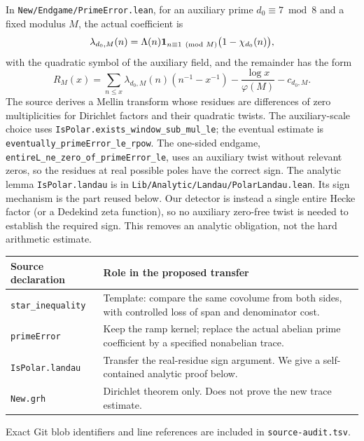 \documentclass[11pt,letterpaper]{article}
\theoremstyle{remark}\newtheorem{remark}[theorem]{Remark}
\newcommand{\code}[1]{\nolinkurl{#1}}
\begin{document}
In \code{New/Endgame/PrimeError.lean}, for an auxiliary prime $d_0\equiv7\bmod 8$ and a fixed modulus $M$, the actual coefficient is
\[
 \lambda_{d_0,M}(n)=\Lambda(n)\mathbf1_{n\equiv1\pmod M}\bigl(1-\chi_{d_0}(n)\bigr),
\]
with the quadratic symbol of the auxiliary field, and the remainder has the form
\[
 R_M(x)=\sum_{n\le x}\lambda_{d_0,M}(n)(n^{-1}-x^{-1})
        -\frac{\log x}{\varphi(M)}-c_{d_0,M}.
\]
The source derives a Mellin transform whose residues are differences of zero multiplicities for Dirichlet factors and their quadratic twists. The auxiliary-scale choice uses \code{IsPolar.exists_window_sub_mul_le}; the eventual estimate is \code{eventually_primeError_le_rpow}. The one-sided endgame, \code{entireL_ne_zero_of_primeError_le}, uses an auxiliary twist without relevant zeros, so the residues at real possible poles have the correct sign. The analytic lemma \code{IsPolar.landau} is in \code{Lib/Analytic/Landau/PolarLandau.lean}. Its sign mechanism is the part reused below. Our detector is instead a single entire Hecke factor (or a Dedekind zeta function), so no auxiliary zero-free twist is needed to establish the required sign. This removes an analytic obligation, not the hard arithmetic estimate.

\begin{center}
\begin{tabularx}{\linewidth}{@{}lX@{}}
\toprule
Source declaration & Role in the proposed transfer\\\midrule
\code{star_inequality} & Template: compare the same covolume from both sides, with controlled loss of span and denominator cost.\\
\code{primeError} & Keep the ramp kernel; replace the actual abelian prime coefficient by a specified nonabelian trace.\\
\code{IsPolar.landau} & Transfer the real-residue sign argument. We give a self-contained analytic proof below.\\
\code{New.grh} & Dirichlet theorem only. Does not prove the new trace estimate.\\\bottomrule
\end{tabularx}
\end{center}
Exact Git blob identifiers and line references are included in \code{source-audit.tsv}.
\end{document}
